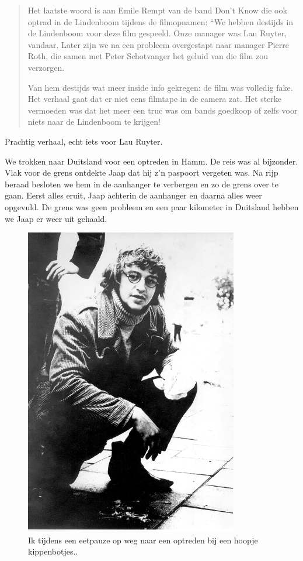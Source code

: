 \documentclass[10pt,twoside, openright]{memoir}
\begin{document}
\begin{quote}
Het laatste woord is aan Emile Rempt van de band Don’t Know die ook optrad in de Lindenboom tijdens de filmopnamen: “We hebben destijds in de Lindenboom voor deze film gespeeld. Onze manager was Lau Ruyter, vandaar. Later zijn we na een probleem overgestapt naar manager Pierre Roth, die samen met Peter Schotvanger het geluid van die film zou verzorgen.

Van hem destijds wat meer inside info gekregen: de film was volledig fake. Het verhaal gaat dat er niet eens filmtape in de camera zat. Het sterke vermoeden was dat het meer een truc was om bands goedkoop of zelfs voor niets naar de Lindenboom te krijgen!
\end{quote}

Prachtig verhaal, echt iets voor Lau Ruyter.

We trokken naar Duitsland voor een optreden in Hamm. De reis was al bijzonder. Vlak voor de grens ontdekte Jaap dat hij z’n paspoort vergeten was. Na rijp beraad besloten we hem in de aanhanger te verbergen en zo de grens over te gaan. Eerst alles eruit, Jaap achterin de aanhanger en daarna alles weer opgevuld. De grens was geen probleem en een paar kilometer in Duitsland hebben we Jaap er weer uit gehaald. 

\begin{figure}
\includegraphics[width=\textwidth]{img/ch30/optourneeAs}
\caption*{\footnotesize Ik tijdens een eetpauze op weg naar een optreden bij een hoopje kippenbotjes..}
\end{figure}
\end{document}
